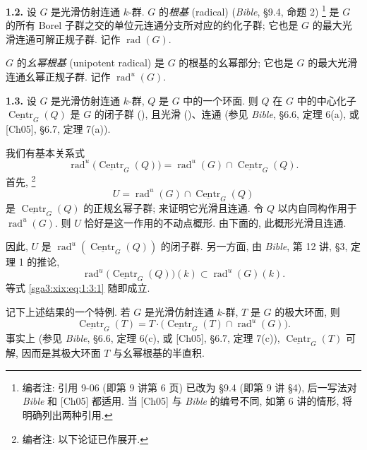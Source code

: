 \noindent{}\textbf{1.2.}\quad
设 \(G\) 是光滑仿射连通 \(k\)-群. \(G\) 的\emph{根基} (radical) (\emph{Bible}, §9.4, 命题 2)%
\footnote{编者注: 引用 9-06 (即第 9 讲第 6 页) 已改为 §9.4 (即第 9 讲 §4), 后一写法对 \emph{Bible} 和 [Ch05] 都适用. 当 [Ch05] 与 \emph{Bible} 的编号不同, 如第 6 讲的情形, 将明确列出两种引用.}
是 \(G\) 的所有 Borel 子群之交的单位元连通分支所对应的约化子群; 它也是 \(G\) 的最大光滑连通可解正规子群. 记作 \(\operatorname{rad}(G)\).

\(G\) 的\emph{幺幂根基} (unipotent radical) 是 \(G\) 的根基的幺幂部分; 它也是 \(G\) 的最大光滑连通幺幂正规子群. 记作 \(\operatorname{rad}^{u}(G)\).

\noindent{}\textbf{1.3.}\quad
设 \(G\) 是光滑仿射连通 \(k\)-群, \(Q\) 是 \(G\) 中的一个环面. 则 \(Q\) 在 \(G\) 中的中心化子
\(\underline{\operatorname{Centr}}_{G}(Q)\)
是 \(G\) 的闭子群 (), 且光滑 ()、连通 (参见 \emph{Bible}, §6.6, 定理 6(a), 或 [Ch05], §6.7, 定理 7(a)).

我们有基本关系式
\begin{equation}
  \operatorname{rad}^{u}\!\bigl(\underline{\operatorname{Centr}}_{G}(Q)\bigr)
  =
  \operatorname{rad}^{u}(G)\cap
  \underline{\operatorname{Centr}}_{G}(Q).
  \tag{1.3.1}\label{sga3:xix:eq:1:3:1}
\end{equation}
首先,%
\footnote{编者注: 以下论证已作展开.}
\[
  U=\operatorname{rad}^{u}(G)\cap
  \underline{\operatorname{Centr}}_{G}(Q)
\]
是 \(\underline{\operatorname{Centr}}_{G}(Q)\) 的正规幺幂子群; 来证明它光滑且连通. 令 \(Q\) 以内自同构作用于 \(\operatorname{rad}^{u}(G)\). 则 \(U\) 恰好是这一作用的不动点概形. 由下面的, 此概形光滑且连通.

因此, \(U\) 是
\(\operatorname{rad}^{u}(\underline{\operatorname{Centr}}_{G}(Q))\)
的闭子群. 另一方面, 由 \emph{Bible}, 第 12 讲, §3, 定理 1 的推论,
\[
  \operatorname{rad}^{u}\!\bigl(
    \underline{\operatorname{Centr}}_{G}(Q)\bigr)(k)
  \subset
  \operatorname{rad}^{u}(G)(k).
\]
等式 \eqref{sga3:xix:eq:1:3:1} 随即成立.

记下上述结果的一个特例. 若 \(G\) 是光滑仿射连通 \(k\)-群, \(T\) 是 \(G\) 的极大环面, 则
\begin{equation}
  \underline{\operatorname{Centr}}_{G}(T)
  =
  T\cdot\bigl(
    \underline{\operatorname{Centr}}_{G}(T)\cap
    \operatorname{rad}^{u}(G)\bigr).
  \tag{1.3.2}\label{sga3:xix:eq:1:3:2}
\end{equation}
事实上 (参见 \emph{Bible}, §6.6, 定理 6(c), 或 [Ch05], §6.7, 定理 7(c)),
\(\underline{\operatorname{Centr}}_{G}(T)\) 可解, 因而是其极大环面 \(T\) 与幺幂根基的半直积.

